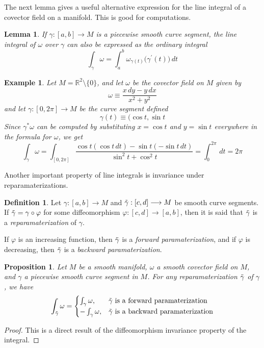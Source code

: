 \documentclass{article}
\newtheorem{proposition}[theorem]{Proposition}
\newtheorem{lemma}[theorem]{Lemma}
\newtheorem{example}{Example}[section]
\theoremstyle{remark}
\theoremstyle{definition}
\newtheorem{definition}{Definition}[section]
\begin{document}
The next lemma gives a useful alternative expression for the line integral of a covector field on a manifold. This is good for computations.

\begin{lemma}
If $\gamma: [a,b] \longrightarrow M$ is a piecewise smooth curve segment, the line integral of $\omega$ over $\gamma$ can also be expressed as the ordinary integral 
\[\int_\gamma \omega = \int_a^b \omega_{\gamma(t)} \big( \gamma^\prime (t) \big)\,dt\]
\end{lemma}

\begin{example}
Let $M = \mathbb{R}^2 \setminus \{0\}$, and let $\omega$ be the covector field on $M$ given by
\[\omega \equiv \frac{x \,dy - y\,dx}{x^2 + y^2}\]
and let $\gamma: [0, 2\pi] \longrightarrow M$ be the curve segment defined 
\[\gamma(t) \equiv \big( \cos{t}, \sin{t} \]
Since $\gamma^* \omega$ can be computed by substituting $x = \cos{t}$ and $y = \sin{t}$ everywhere in the formula for $\omega$, we get
\[\int_\gamma \omega = \int_{[0,2\pi]} \frac{\cos{t} (\cos{t}\,dt) - \sin{t} (-\sin{t}\,dt)}{\sin^2{t} + \cos^2{t}} = \int_0^{2\pi} \,dt = 2\pi\]
\end{example}

Another important property of line integrals is invariance under reparamaterizations.

\begin{definition}
Let $\gamma: [a,b] \longrightarrow M$ and $\Tilde{\gamma}: [c,d] \longrightarrow M$ be smooth curve segments. If $\Tilde{\gamma} = \gamma \circ \varphi$ for some diffeomorphism $\varphi: [c,d] \longrightarrow [a,b]$, then it is said that $\Tilde{\gamma}$ is a \textit{reparamaterization} of $\gamma$. 

If $\varphi$ is an increasing function, then $\Tilde{\gamma}$ is a \textit{forward paramaterization}, and if $\varphi$ is decreasing, then $\Tilde{\gamma}$ is a \textit{backward paramaterization}. 
\end{definition}

\begin{proposition}
Let $M$ be a smooth manifold, $\omega$ a smooth covector field on $M$, and $\gamma$ a piecewise smooth curve segment in $M$. For any reparamaterization $\Tilde{\gamma}$ of $\gamma$, we have
\[\int_{\Tilde{\gamma}} \omega = \begin{cases}
      \int_\gamma \omega, & \Tilde{\gamma} \text{ is a forward paramaterization} \\
      - \int_\gamma \omega, & \Tilde{\gamma} \text{ is a backward paramaterization}
\end{cases}\]
\end{proposition}
\begin{proof}
This is a direct result of the diffeomorphism invariance property of the integral. 
\end{proof}
\end{document}
